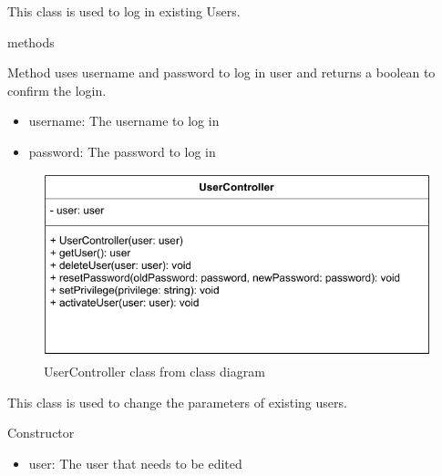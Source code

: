 This class is used to log in existing Users.

\begin{methodenv}{methods}


Method uses username and password to log in user and returns a boolean to confirm the login.

\begin{itemize}
	\item{username:}
	The username to log in
	\item{password:}
	The password to log in
\end{itemize}
\end{methodenv}





\begin{figure}[h]
\centerline{\includegraphics[scale=1]{res/Klassen/UserControllerClass.pdf}}
\caption{UserController class from class diagram}
\end{figure}

This class is used to change the parameters of existing users.

\begin{methodenv}{Constructor}



\begin{itemize}
	\item{user:}
	The user that needs to be edited
\end{itemize}
\end{methodenv}

